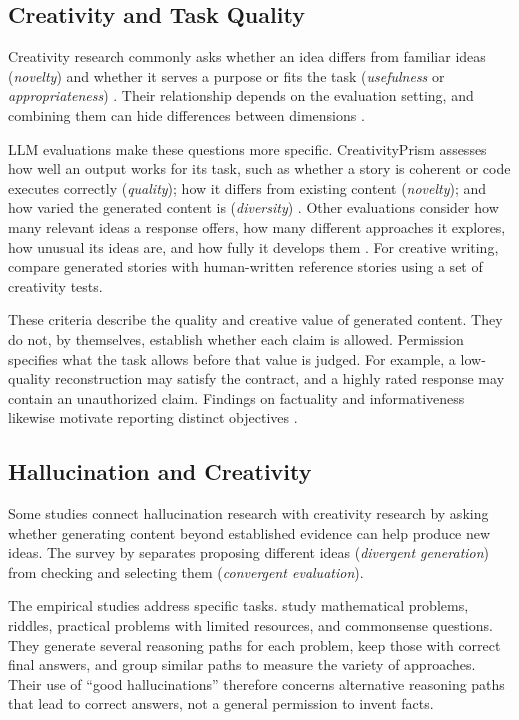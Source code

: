 \documentclass{clv2025}
\begin{document}
\subsection{Creativity and Task Quality}\label{subsec:creativity}

Creativity research commonly asks whether an idea differs from familiar
ideas (\emph{novelty}) and whether it serves a purpose or fits the task
(\emph{usefulness} or \emph{appropriateness})
\citep{runco_standard_2012,diedrich_are_2015}.
Their relationship depends on the evaluation setting, and combining them can
hide differences between dimensions \citep{pichot_reflective_2024}.

LLM evaluations make these questions more specific. CreativityPrism assesses
how well an output works for its task, such as whether a story is coherent
or code executes correctly (\emph{quality}); how it differs from existing
content (\emph{novelty}); and how varied the generated content is
(\emph{diversity}) \citep{hou_creativityprism_2025}.
Other evaluations consider how many relevant ideas a response offers, how
many different approaches it explores, how unusual its ideas are, and how
fully it develops them \citep{zhao_assessing_2025}. For creative writing,
\citet{li_automated_2025} compare generated stories with human-written
reference stories using a set of creativity tests.

These criteria describe the quality and creative value of generated content.
They do not, by themselves, establish whether each claim is allowed.
Permission specifies what the task allows before that value is judged.
For example,
a low-quality reconstruction may satisfy the contract, and a highly rated
response may contain an unauthorized claim. Findings on factuality and
informativeness likewise motivate reporting distinct objectives
\citep{wu_balancing_2025,gong_factuality_2026}.

\subsection{Hallucination and Creativity}

Some studies connect hallucination research with creativity research by
asking whether generating content beyond established evidence can help
produce new ideas. The survey by \citet{jiang_survey_2024} separates
proposing different ideas (\emph{divergent generation}) from checking and
selecting them (\emph{convergent evaluation}).

The empirical studies address specific tasks. \citet{sun_hallucinating_2024}
study mathematical problems, riddles, practical problems with limited
resources, and commonsense questions. They generate several reasoning paths
for each problem, keep those with correct final answers, and group similar
paths to measure the variety of approaches. Their use of ``good
hallucinations'' therefore concerns alternative reasoning paths that lead
to correct answers, not a general permission to invent facts.
\end{document}

